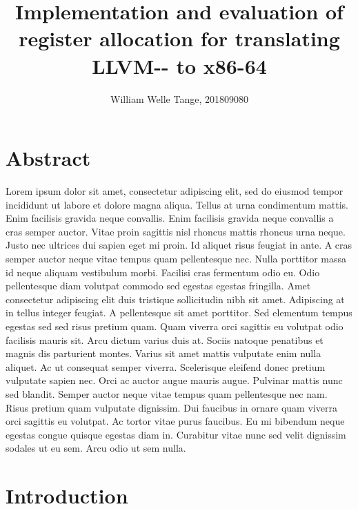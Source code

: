 \documentclass{article}
\title{\myfont Implementation and evaluation of register allocation for translating LLVM-{}- to x86-64}
\author{William Welle Tange, 201809080}
\begin{document}
\maketitle
\begin{center}

\end{center}
\newpage


\section*{Abstract}
Lorem ipsum dolor sit amet, consectetur adipiscing elit, sed do eiusmod tempor incididunt ut labore et dolore magna aliqua. Tellus at urna condimentum mattis. Enim facilisis gravida neque convallis. Enim facilisis gravida neque convallis a cras semper auctor. Vitae proin sagittis nisl rhoncus mattis rhoncus urna neque. Justo nec ultrices dui sapien eget mi proin. Id aliquet risus feugiat in ante. A cras semper auctor neque vitae tempus quam pellentesque nec. Nulla porttitor massa id neque aliquam vestibulum morbi. Facilisi cras fermentum odio eu. Odio pellentesque diam volutpat commodo sed egestas egestas fringilla. Amet consectetur adipiscing elit duis tristique sollicitudin nibh sit amet. Adipiscing at in tellus integer feugiat. A pellentesque sit amet porttitor. Sed elementum tempus egestas sed sed risus pretium quam. Quam viverra orci sagittis eu volutpat odio facilisis mauris sit. Arcu dictum varius duis at. Sociis natoque penatibus et magnis dis parturient montes. Varius sit amet mattis vulputate enim nulla aliquet. Ac ut consequat semper viverra. Scelerisque eleifend donec pretium vulputate sapien nec. Orci ac auctor augue mauris augue. Pulvinar mattis nunc sed blandit. Semper auctor neque vitae tempus quam pellentesque nec nam. Risus pretium quam vulputate dignissim. Dui faucibus in ornare quam viverra orci sagittis eu volutpat. Ac tortor vitae purus faucibus. Eu mi bibendum neque egestas congue quisque egestas diam in. Curabitur vitae nunc sed velit dignissim sodales ut eu sem. Arcu odio ut sem nulla.
\newpage

\tableofcontents
\newpage




    
\setcounter{page}{1}

\section{Introduction}
\end{document}
